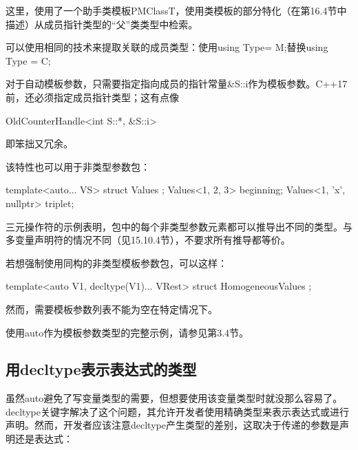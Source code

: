 这里，使用了一个助手类模板PMClassT，使用类模板的部分特化（在第16.4节中描述）从成员指针类型的“父”类类型中检索。

\begin{notice}
可以使用相同的技术来提取关联的成员类型：使用using Type= M;替换using Type = C;
\end{notice}

对于自动模板参数，只需要指定指向成员的指针常量\&S::i作为模板参数。C++17前，还必须指定成员指针类型；这有点像

\begin{cpp}
OldCounterHandle<int S::*, &S::i>
\end{cpp}

即笨拙又冗余。

该特性也可以用于非类型参数包：

\begin{cpp}
template<auto... VS> struct Values {};
Values<1, 2, 3> beginning;
Values<1, 'x', nullptr> triplet;
\end{cpp}

三元操作符的示例表明，包中的每个非类型参数元素都可以推导出不同的类型。与多变量声明符的情况不同（见15.10.4节），不要求所有推导都等价。

若想强制使用同构的非类型模板参数包，可以这样：

\begin{cpp}
template<auto V1, decltype(V1)... VRest> struct HomogeneousValues {};
\end{cpp}

然而，需要模板参数列表不能为空在特定情况下。

使用auto作为模板参数类型的完整示例，请参见第3.4节。

\subsection{用decltype表示表达式的类型}

虽然auto避免了写变量类型的需要，但想要使用该变量类型时就没那么容易了。decltype关键字解决了这个问题，其允许开发者使用精确类型来表示表达式或进行声明。然而，开发者应该注意decltype产生类型的差别，这取决于传递的参数是声明还是表达式：

